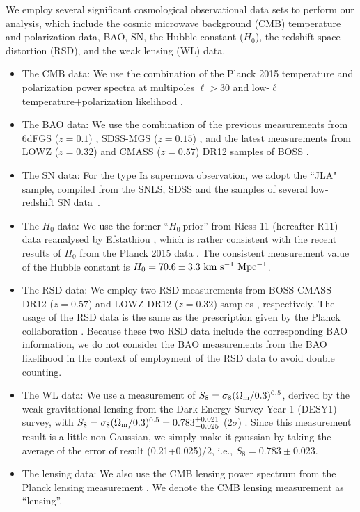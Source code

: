 \documentclass[aps,prd,nofootinbib,amsmath,amssymb,twocolumn,superscriptaddress,10pt]{revtex4}%
\begin{document}
We employ several significant cosmological observational data sets to perform our analysis, which include the cosmic microwave background (CMB) temperature and polarization data, BAO, SN, the Hubble constant ($H_{0}$), the redshift-space distortion (RSD), and the weak lensing (WL) data.

\begin{itemize}
 \item The CMB data: We use the combination of the Planck 2015 temperature and polarization power spectra at multipoles $\ell>30$ and low-$\ell$ temperature+polarization likelihood \cite{Aghanim:2015xee}.
 \item The BAO data: We use the combination of the previous measurements from 6dFGS ($z=0.1$) \cite{Beutler:2011hx}, SDSS-MGS ($z=0.15$) \cite{Ross:2014qpa}, and the latest measurements from LOWZ ($z=0.32$) and CMASS ($z=0.57$) DR12 samples of BOSS \cite{Gil-Marin:2015nqa}.
 \item The SN data: For the type Ia supernova observation, we adopt the ``JLA" sample, compiled from the SNLS, SDSS and the samples of several low-redshift SN data~\cite{Betoule:2014frx}.
 \item The $H_{0}$ data: We use the former ``$H_{0}~$prior'' from Riess 11 (hereafter R11) data reanalysed by Efstathiou \cite{Efstathiou:2013via}, which is rather consistent with the recent results of $H_{0}$ from the Planck 2015 data \cite{Ade:2015xua}. The consistent measurement value of the Hubble constant is $H_{0}=70.6\pm3.3 ~\rm km  ~s^{-1} ~Mpc^{-1}$.
 \item The RSD data: We employ two RSD measurements from BOSS CMASS DR12 ($z=0.57$) and LOWZ DR12 ($z=0.32$) samples \cite{Gil-Marin:2016wya}, respectively. The usage of the RSD data is the same as the prescription given by the Planck collaboration \cite{Ade:2015xua}. {Because these two RSD data  include the corresponding BAO information, we do not consider the BAO measurements \cite{Gil-Marin:2015nqa} from the BAO likelihood in the context of employment of the RSD data to avoid double counting}.

 \item The WL data: We use a measurement of $S_{8}=\sigma_{8}(\Omega_{\rm m}/0.3)^{0.5}$, derived by the weak gravitational lensing from the Dark Energy Survey Year 1 (DESY1) survey, with $S_{8}=\sigma_{8}(\Omega_{\rm m}/0.3)^{0.5}=0.783^{+0.021}_{-0.025}$ ($2\sigma$) \cite{Abbott:2017wau}. Since this measurement result is a little non-Gaussian, we simply make it gaussian by taking the average of the error of result {(0.21+0.025)/2}, i.e., $S_{8}=0.783\pm0.023$.
 \item The lensing data: We also use the CMB lensing power spectrum from the Planck lensing measurement \cite{Ade:2015zua}. We denote the CMB lensing measurement as ``lensing''.

\end{itemize}
\end{document}
